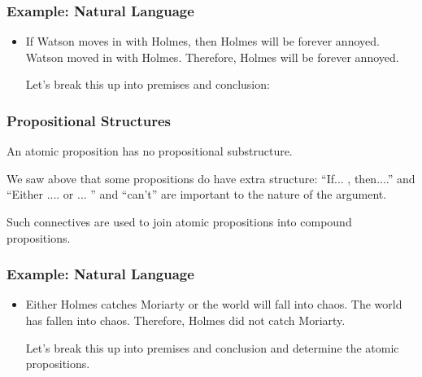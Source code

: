 \documentclass{beamer}
\begin{document}
\begin{frame}
	\frametitle{Example: Natural Language}
	
	\begin{itemize}
		\item If Watson moves in with Holmes, then Holmes will be forever annoyed. Watson moved in with Holmes. Therefore, Holmes will be forever annoyed.

		\vspace{0.5cm}

		Let's break this up into premises and conclusion: 
		
		\vspace{5cm}
		
		
	\end{itemize}
\end{frame}

\begin{frame}
	\frametitle{Propositional Structures}
	
	\begin{center} 
		
		An atomic proposition has no propositional substructure.
		
	\end{center}


	
	We saw above that some propositions do have extra structure: ``If... , then....'' and ``Either .... or ... '' and ``can't'' are important to the nature of the argument. 
	
	\vspace{0.5cm}
	
	Such connectives are used to join atomic propositions into compound propositions.	
\end{frame}

\begin{frame}
	\frametitle{Example: Natural Language}
	
	\begin{itemize}
		\item Either Holmes catches Moriarty or the world will fall into chaos. The world has fallen into chaos. Therefore, Holmes did not catch Moriarty.
		
		\vspace{0.5cm}
		
		Let's break this up into premises and conclusion and determine the atomic propositions.
		
		\vspace{5cm}
		
		
	\end{itemize}
\end{frame}
\end{document}

